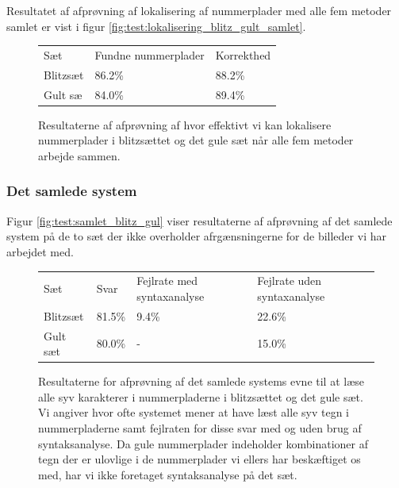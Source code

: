 Resultatet af afprøvning af lokalisering af nummerplader med alle fem metoder samlet er vist i figur \vref{fig:test:lokalisering_blitz_gult_samlet}.

\begin{figure}[htp]
\centering
  \begin{tabular}{|l|l|l|}
    \hline
    \rowcolor[gray]{0.9} \multicolumn{3}{|>{\columncolor[gray]{0.9}}c|}{\textbf{Samlet metode til lokalisering}} \\
    \hline
    Sæt      & Fundne nummerplader & Korrekthed\\ \hline
    Blitzsæt &  86.2\%             & 88.2\% \\ \hline
    Gult sæ  &  84.0\%             & 89.4\% \\ \hline
  \end{tabular}
\caption{Resultaterne af afprøvning af hvor effektivt vi kan lokalisere nummerplader i blitzsættet og det gule sæt når alle fem metoder arbejde sammen.}
\label{fig:test:lokalisering_blitz_gult_samlet}
\end{figure}


\subsubsection{Det samlede system}
Figur \vref{fig:test:samlet_blitz_gul} viser resultaterne af afprøvning af det samlede system på de to sæt der ikke overholder afrgænsningerne for de billeder vi har arbejdet med.

\begin{figure}[htp]
\centering
\begin{tabular}{|l|l|p{2.5cm}|p{2.5cm}|}\hline
\rowcolor[gray]{0.9} \multicolumn{4}{|>{\columncolor[gray]{0.9}}c|}{\textbf{Samlet system}} \\ \hline
Sæt      & Svar   & Fejlrate med syntaxanalyse & Fejlrate uden syntaxanalyse \\ \hline
Blitzsæt & 81.5\% & 9.4\%                      & 22.6\%                      \\ \hline
Gult sæt & 80.0\% & -                          & 15.0\%                      \\ \hline
\end{tabular}
\caption{Resultaterne for afprøvning af det samlede systems evne til at læse alle syv karakterer i nummerpladerne i blitzsættet og det gule sæt. Vi angiver hvor ofte systemet mener at have læst alle syv tegn i nummerpladerne samt fejlraten for disse svar med og uden brug af syntaksanalyse. Da gule nummerplader indeholder kombinationer af tegn der er ulovlige i de nummerplader vi ellers har beskæftiget os med, har vi ikke foretaget syntaksanalyse på det sæt.}
\label{fig:test:samlet_blitz_gul}
\end{figure}

